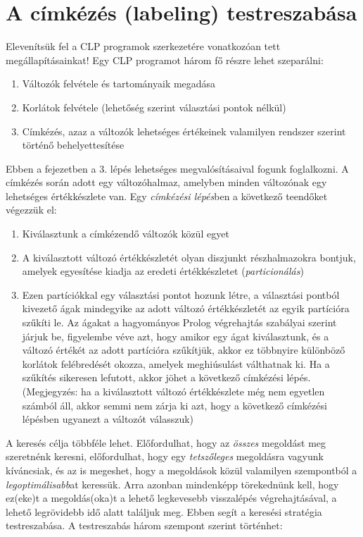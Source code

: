 \section{A címkézés (labeling) testreszabása}

Elevenítsük fel a CLP programok szerkezetére vonatkozóan tett megállapításainkat!
Egy CLP programot három fő részre lehet szeparálni:

\begin{enumerate}
\item Változók felvétele és tartományaik megadása
\item Korlátok felvétele (lehetőség szerint választási pontok nélkül)
\item Címkézés, azaz a változók lehetséges értékeinek valamilyen rendszer szerint
történő behelyettesítése
\end{enumerate}

Ebben a fejezetben a 3. lépés lehetséges megvalósításaival fogunk foglalkozni.
A címkézés során adott egy változóhalmaz, amelyben minden változónak egy lehetséges
értékkészlete van. Egy \emph{címkézési lépés}ben a következő teendőket végezzük el:

\begin{enumerate}
\item Kiválasztunk a címkézendő változók közül egyet
\item A kiválasztott változó értékkészletét olyan diszjunkt részhalmazokra bontjuk,
amelyek egyesítése kiadja az eredeti értékkészletet (\emph{particionálás})
\item Ezen partíciókkal egy választási pontot hozunk létre, a választási pontból
kivezető ágak mindegyike az adott változó értékkészletét az egyik partícióra
szűkíti le. Az ágakat a hagyományos Prolog végrehajtás szabályai szerint járjuk
be, figyelembe véve azt, hogy amikor egy ágat kiválasztunk, és a változó értékét
az adott partícióra szűkítjük, akkor ez többnyire különböző korlátok felébredését
okozza, amelyek meghiúsulást válthatnak ki. Ha a szűkítés sikeresen lefutott, akkor
jöhet a következő címkézési lépés. (Megjegyzés: ha a kiválasztott változó
értékkészlete még nem egyetlen számból áll, akkor semmi nem zárja ki azt, hogy a
következő címkézési lépésben ugyanezt a változót válasszuk)
\end{enumerate}

A keresés célja többféle lehet. Előfordulhat, hogy az \emph{összes} megoldást meg
szeretnénk keresni, előfordulhat, hogy egy \emph{tetszőleges} megoldásra vagyunk kíváncsiak,
és az is megeshet, hogy a megoldások közül valamilyen szempontból a \emph{legoptimálisabb}at
keressük. Arra azonban mindenképp törekednünk kell, hogy ez(eke)t a megoldás(oka)t a lehető
legkevesebb visszalépés végrehajtásával, a lehető legrövidebb idő alatt találjuk meg.
Ebben segít a keresési stratégia testreszabása. A testreszabás három szempont szerint
történhet:

